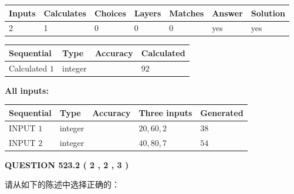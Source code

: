 \documentclass{ctexart}
\begin{document}
 
\noindent{}
 
 

 
   
   
   
   
\noindent\begin{tabular}{|l|l|l|l|l|l|l|}
 \hline
Inputs & Calculates & Choices & Layers & Matches & Answer & Solution \\ \hline
 2  & 
 1  & 
 0
  & 
 0  & 
 0  & 
  yes & 
  yes 
  \\ \hline
 \end{tabular}
   
   
   
   
\noindent{}
   
   
  
  
\noindent\begin{tabular}{|l|l|l|l|}
\hline
 Sequential & Type & Accuracy & Calculated \\ 
\hline
 
 
  Calculated $  1 $ & integer &  & 
  $ 92 $ 
 \\  \hline  
 \end{tabular}
   
   
   
   
\noindent\vspace{0.1in}\hspace{-0.08in} {\textbf{\Large{All inputs: }}}
   
   
  
  
\noindent\begin{tabular}{|l|l|l|l|l|}
\hline
 Sequential & Type & Accuracy & Three inputs & Generated \\ 
\hline
 
 
  INPUT $  1 $ & integer &  & $
 20
 , 
 60
 , 
 2
 $ & $ 38 $ 
 \\  \hline  
 
 
  INPUT $  2 $ & integer &  & $
 40
 , 
 80
 , 
 7
 $ & $ 54 $ 
 \\  \hline  
 \end{tabular}
   
   
  
\vspace{0.2in}
  
{\textbf{\Large{QUESTION
523.2 
 ( 2 , 2 , 3 )
}}}
  
  
请从如下的陈述中选择正确的：
 
\end{document}
